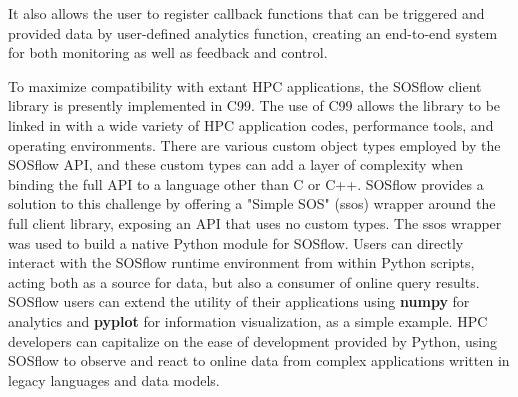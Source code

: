 %
It also allows the user to register callback functions that can be
triggered and provided data by user-defined analytics function,
creating an end-to-end system for both monitoring as well as feedback
and control.
%
%
\par
%
To maximize compatibility with extant HPC applications, the SOSflow client
library is presently implemented in C99.
%
The use of C99 allows the library to be linked in with a wide variety of
HPC application codes, performance tools, and operating environments.
%
There are various custom object types employed by the SOSflow API, and these
custom types can add a layer of complexity when binding the full API to
a language other than C or C++.
%
SOSflow provides a solution to this challenge by offering a "Simple SOS"
(ssos) wrapper around the full client library, exposing an API that uses no
custom types.
%
The ssos wrapper was used to build a native Python module for SOSflow.
%
Users can directly interact with the SOSflow runtime environment from
within Python scripts, acting both as a source for data, but also a
consumer of online query results.
%
SOSflow users can extend the utility of their applications using
\textbf{numpy} for analytics and \textbf{pyplot} for information
visualization, as a simple example.
%
HPC developers can capitalize on the ease of development provided by Python,
using SOSflow to observe and react to online data from complex applications
written in legacy languages and data models.
%
